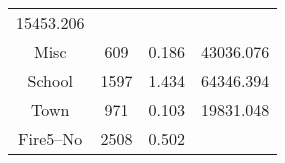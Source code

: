 \documentclass[]{book}
\theoremstyle{definition}
\theoremstyle{definition}
\theoremstyle{definition}
\theoremstyle{remark}
\begin{document}
\begin{longtable}[]{@{}cccc@{}}
\begin{minipage}[t]{0.14\columnwidth}
15453.206\strut
\end{minipage}\tabularnewline
\begin{minipage}[t]{0.26\columnwidth}\centering\strut
Misc\strut
\end{minipage} & \begin{minipage}[t]{0.14\columnwidth}\centering\strut
609\strut
\end{minipage} & \begin{minipage}[t]{0.11\columnwidth}\centering\strut
0.186\strut
\end{minipage} & \begin{minipage}[t]{0.14\columnwidth}\centering\strut
43036.076\strut
\end{minipage}\tabularnewline
\begin{minipage}[t]{0.26\columnwidth}\centering\strut
School\strut
\end{minipage} & \begin{minipage}[t]{0.14\columnwidth}\centering\strut
1597\strut
\end{minipage} & \begin{minipage}[t]{0.11\columnwidth}\centering\strut
1.434\strut
\end{minipage} & \begin{minipage}[t]{0.14\columnwidth}\centering\strut
64346.394\strut
\end{minipage}\tabularnewline
\begin{minipage}[t]{0.26\columnwidth}\centering\strut
Town\strut
\end{minipage} & \begin{minipage}[t]{0.14\columnwidth}\centering\strut
971\strut
\end{minipage} & \begin{minipage}[t]{0.11\columnwidth}\centering\strut
0.103\strut
\end{minipage} & \begin{minipage}[t]{0.14\columnwidth}\centering\strut
19831.048\strut
\end{minipage}\tabularnewline
\begin{minipage}[t]{0.26\columnwidth}\centering\strut
Fire5--No\strut
\end{minipage} & \begin{minipage}[t]{0.14\columnwidth}\centering\strut
2508\strut
\end{minipage} & \begin{minipage}[t]{0.11\columnwidth}\centering\strut
0.502\strut
\end{minipage} & \begin{minipage}[t]{0.14\columnwidth}\centering\strut

\end{minipage}
\end{longtable}
\end{document}
